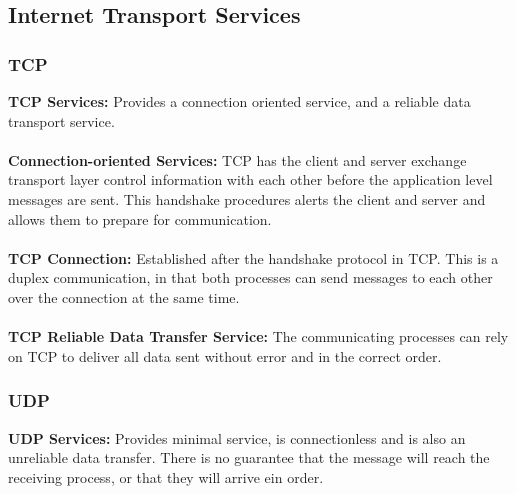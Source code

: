 \documentclass[]{article}
\begin{document}
\subsection{Internet Transport Services}
\subsubsection{TCP}
\textcolor{Emerald}{\textbf{TCP Services:}} Provides a connection oriented service, and a reliable data transport service. \\\\
\textcolor{Emerald}{\textbf{Connection-oriented Services:}} TCP has the client and server exchange transport layer control information with each other before the application level messages are sent. This handshake procedures alerts the client and server and allows them to prepare for communication. \\\\
\textcolor{Emerald}{\textbf{TCP Connection:}} Established after the handshake protocol in TCP. This is a duplex communication, in that both processes can send messages to each other over the connection at the same time. \\\\
\textcolor{Emerald}{\textbf{TCP Reliable Data Transfer Service:}} The communicating processes can rely on TCP to deliver all data sent without error and in the correct order. 
\subsubsection{UDP}
\textcolor{Emerald}{\textbf{UDP Services:}} Provides minimal service, is connectionless and is also an unreliable data transfer. There is no guarantee that the message will reach the receiving process, or that they will arrive ein order. 
\end{document}
